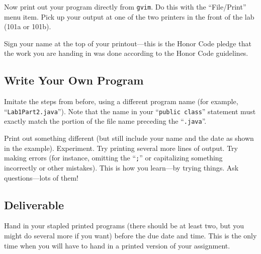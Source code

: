 Now print out your program
directly from {\tt gvim}. Do this with the ``File/Print'' menu item. Pick up
your output at one of the two printers in the front of the lab (101a or 101b).
%
%
%
%



Sign your name at the top of your printout---this is the Honor Code pledge
that the work you are handing in was done according to the Honor Code guidelines.

\subsection*{Write Your Own Program}
Imitate the steps from before, using a different program name (for
example, ``{\tt Lab1Part2.java}''). Note that the name in your ``{\tt public
class}'' statement must exactly match the portion of the file name
preceding the ``{\tt .java}''.

Print out something different (but still include your name and the date
as shown in the example). Experiment. Try printing several more lines of output.
Try making errors (for instance, omitting the ``{\tt ;}'' or capitalizing
something incorrectly or other mistakes). This is how you learn---by trying
things. Ask questions---lots of them! 

\subsection*{Deliverable}
Hand in your stapled printed programs (there should be
at least two, but you might do several more if you want) before the due date
and time. 
This is the only time when you will have to hand in a printed version of your assignment.


